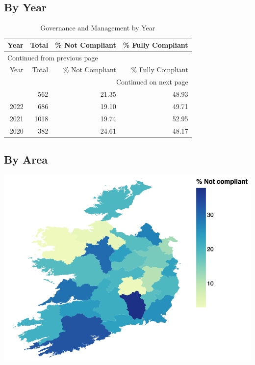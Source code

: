 \documentclass[a4paper,11pt,twoside]{article}
\begin{document}
\subsection{By Year}
\label{sec:org67da710}
\begin{longtable}{rrrr}
\caption{Governance and Management by Year}
\\[0pt]
Year & Total & \% Not Compliant & \% Fully Compliant\\[0pt]
\hline
\endfirsthead
\multicolumn{4}{l}{Continued from previous page} \\[0pt]
\hline

Year & Total & \% Not Compliant & \% Fully Compliant \\[0pt]

\hline
\endhead
\hline\multicolumn{4}{r}{Continued on next page} \\
\endfoot
\endlastfoot
\hline
2023 & 562 & 21.35 & 48.93\\[0pt]
2022 & 686 & 19.10 & 49.71\\[0pt]
2021 & 1018 & 19.74 & 52.95\\[0pt]
2020 & 382 & 24.61 & 48.17\\[0pt]
\end{longtable}
\subsection{By Area}
\label{sec:orgf7b804a}
\begin{center}
\includegraphics[width=.9\linewidth]{img/11_1_reg_23_percent_notitle.png}
\end{center}
\end{document}
